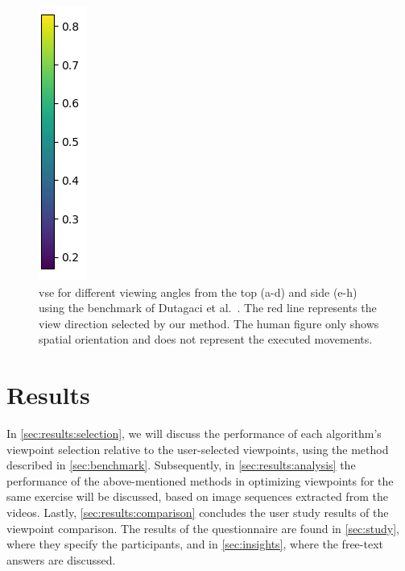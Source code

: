 \begin{figure}[ht]
	    \includegraphics[width=0.041\linewidth]{pictures/scale.png}
	\caption[Comparison of our method to user selected view points.]{\acrfull{vse} for different viewing angles from the top (a-d) and side (e-h) using the benchmark of Dutagaci et al.~\cite{dutagaci2010bbv}. The red line represents the view direction selected by our method. The human figure only shows spatial orientation and does not represent the executed movements.}
	\label{fig:colorMaps}
\end{figure}

\section{Results\label{results}}
In \autoref{sec:results:selection}, we will discuss the performance of each algorithm's viewpoint selection relative to the user-selected viewpoints, using the method described in \autoref{sec:benchmark}. Subsequently, in \autoref{sec:results:analysis} the performance of the above-mentioned methods in optimizing viewpoints for the same exercise will be discussed, based on image sequences extracted from the videos. Lastly, \autoref{sec:results:comparison} concludes the user study results of the viewpoint comparison. The results of the questionnaire are found in \autoref{sec:study}, where they specify the participants, and in \autoref{sec:insights}, where the free-text answers are discussed.

